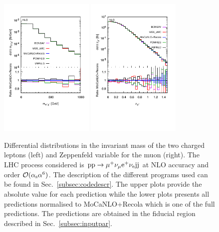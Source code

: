 \begin{figure}[hbt!]
   \centering
   \includegraphics[width=0.4\textwidth,angle=0,clip=true,trim={0.4cm 2cm 0.cm 1.cm}]{figures/NLO/mll_NLO.pdf}
   \includegraphics[width=0.4\textwidth,angle=0,clip=true,trim={0.4cm 2cm 0.cm 1.cm}]{figures/NLO/zmu_NLO.pdf}
\caption{\label{fig:distNLO3} Differential distributions in the invariant mass of the two charged leptons (left) and Zeppenfeld variable for the muon (right).
The LHC process considered is ${\rm p}{\rm p}\to\mu^+\nu_\mu{\rm e}^+\nu_{\rm e}{\rm j}{\rm j}$ at NLO accuracy and order $\mathcal{O}(\alpha_{\rm s}\alpha^6)$.
The description of the different programs used can be found in Sec.~\ref{subsec:codedescr}.
The upper plots provide the absolute value for each prediction while the lower plots presents all predictions normalised to {\sc MoCaNLO}+{\sc Recola} which is one of the full predictions.
The predictions are obtained in the fiducial region described in Sec.~\ref{subsec:inputpar}.
}
\end{figure}

